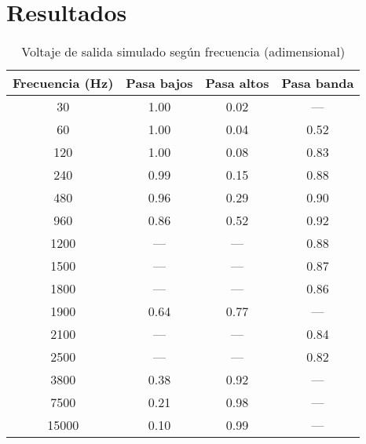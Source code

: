 \section{Resultados}


\begin{table}[H]
  \centering
  \caption{Voltaje de salida simulado según frecuencia (adimensional)}\label{tab:filtros}
  \begin{tabular}{cccc}
    \toprule
    \textbf{Frecuencia (Hz)} & \textbf{Pasa bajos} & \textbf{Pasa altos} & \textbf{Pasa banda} \\
    \midrule
    30     & 1.00 & 0.02 & ---   \\
    60     & 1.00 & 0.04 & 0.52 \\
    120    & 1.00 & 0.08 & 0.83 \\
    240    & 0.99 & 0.15 & 0.88 \\
    480    & 0.96 & 0.29 & 0.90 \\
    960    & 0.86 & 0.52 & 0.92 \\
    1200   & ---   & ---   & 0.88 \\
    1500   & ---   & ---   & 0.87 \\
    1800   & ---   & ---   & 0.86 \\
    1900   & 0.64 & 0.77 & ---   \\
    2100   & ---   & ---   & 0.84 \\
    2500   & ---   & ---   & 0.82 \\
    3800   & 0.38 & 0.92 & ---   \\
    7500   & 0.21 & 0.98 & ---   \\
    15000  & 0.10 & 0.99 & ---   \\
    \bottomrule
  \end{tabular}
\end{table}

